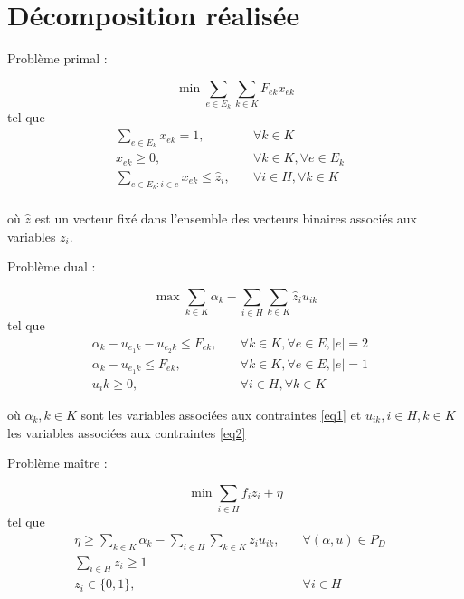\section{Décomposition réalisée}

Problème primal :

\[ \min \sum_{e \in E_k}\sum_{k \in K}F_{ek}x_{ek}\]
tel que
\begin{subequations}
    \begin{align}
        \sum_{e \in E_k}x_{ek} = 1, \quad &\forall{k\in K}&\\
        x_{ek} \ge 0, \quad &\forall{k \in K}, \forall{e \in E_k} \label{eq1}&\\
        \sum_{e \in E_k:i\in e}x_{ek} \le \hat{z}_i,\quad &\forall{i \in H}, \forall{k\in K}\label{eq2}&\\
    \end{align}
\end{subequations}

où $\hat{z}$ est un vecteur fixé dans l'ensemble des vecteurs binaires associés aux variables $z_i$.

\smallskip

Problème dual :

\[ \max \sum_{k \in K}\alpha_k - \sum_{i \in H}\sum_{k \in K} \hat{z}_iu_{ik}\]
tel que
\begin{subequations}
    \begin{align}
        \alpha_k - u_{e_1k} - u_{e_2k} \le F_{ek}, \quad &\forall{k\in K}, \forall{e \in E}, |e| = 2&\\
        \alpha_k - u_{e_1k} \le F_{ek}, \quad &\forall{k\in K}, \forall{e \in E}, |e| = 1&\\
        u_ik \ge 0, \quad &\forall{i \in H}, \forall{k \in K}
    \end{align}
\end{subequations}

où $\alpha_k, k\in K$ sont les variables associées aux contraintes \ref{eq1} et $u_{ik}, i \in H, k \in K$ les variables associées aux contraintes \ref{eq2}

\smallskip

Problème maître :

\[ \min \sum_{i \in H} f_iz_i + \eta\]
tel que
\begin{subequations}
    \begin{align}
       \eta \ge \sum_{k \in K}\alpha_k - \sum_{i \in H}\sum_{k \in K} z_iu_{ik}, \quad &\forall{(\alpha,u) \in P_D}&\\
       \sum_{i \in H} z_i \ge 1 \quad &&\\
        z_i \in \{0,1\}, \quad & \forall{i \in H}&
    \end{align}
\end{subequations}
	

	
